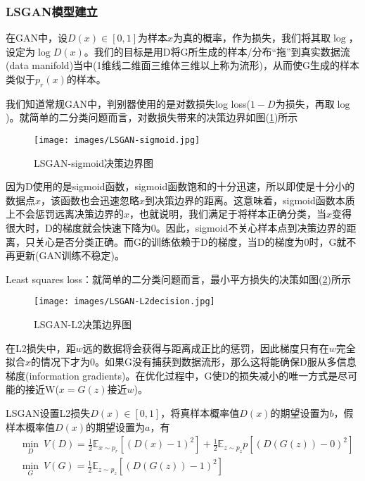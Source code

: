         \subsubsection{LSGAN模型建立}
            \par
            在GAN中，设$D(x)\in [0,1]$为样本$x$为真的概率，作为损失，我们将其取$\log$，设定为$\log D(x)$。我们的目标是用D将G所生成的样本/分布“拖”到真实数据流(data manifold)当中(1维线二维面三维体三维以上称为流形)，从而使G生成的样本类似于$p_r(x)$的样本。
            \par
            我们知道常规GAN中，判别器使用的是对数损失log loss($1-D$为损失，再取$\log$)。就简单的二分类问题而言，对数损失带来的决策边界如图(\ref{fig:LSGAN-sigmoid决策边界图})所示
                \begin{figure}[H]
                \centering
                \texttt{[image: images/LSGAN-sigmoid.jpg]}
                \caption{LSGAN-sigmoid决策边界图}
                \label{fig:LSGAN-sigmoid决策边界图}
                \end{figure}
            因为D使用的是sigmoid函数，sigmoid函数饱和的十分迅速，所以即使是十分小的数据点$x$，该函数也会迅速忽略$x$到决策边界的距离。这意味着，sigmoid函数本质上不会惩罚远离决策边界的$x$，也就说明，我们满足于将样本正确分类，当$x$变得很大时，D的梯度就会快速下降为0。因此，sigmoid不关心样本点到决策边界的距离，只关心是否分类正确。而G的训练依赖于D的梯度，当D的梯度为0时，G就不再更新(GAN训练不稳定)。
            \par
            Least squares loss：就简单的二分类问题而言，最小平方损失的决策如图(\ref{fig:LSGAN-L2决策边界图})所示
                \begin{figure}[H]
                \centering
                \texttt{[image: images/LSGAN-L2decision.jpg]}
                \caption{LSGAN-L2决策边界图}
                \label{fig:LSGAN-L2决策边界图}
                \end{figure}
            在L2损失中，距$w$远的数据将会获得与距离成正比的惩罚，因此梯度只有在$w$完全拟合$x$的情况下才为0。如果G没有捕获到数据流形，那么这将能确保D服从多信息梯度(information gradients)。在优化过程中，G使D的损失减小的唯一方式是尽可能的接近W($x = G(z)$接近$w$)。
            \par
            LSGAN设置L2损失$D(x)\in [0,1]$，将真样本概率值$D(x)$的期望设置为$b$，假样本概率值$D(x)$的期望设置为$a$，有
            \begin{align*}
            & \min_D \ V(D) = \frac{1}{2} \mathbb{E}_{x\sim p_r}[(D(x) - 1)^2] + \frac{1}{2}\mathbb{E}_{z\sim p_z}p[(D(G(z))-0)^2]\\
            & \min_G \ V(G) = \frac 12 \mathbb{E}_{z\sim p_z}[(D(G(z))-1)^2]
            \end{align*}
